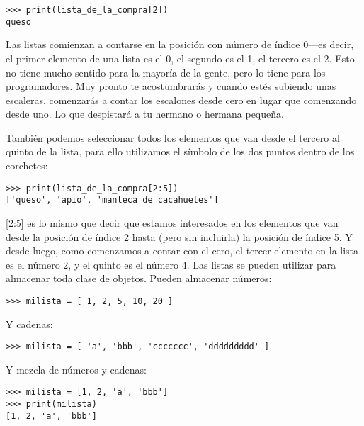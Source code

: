 \begin{listing}
\begin{verbatim}
>>> print(lista_de_la_compra[2])
queso
\end{verbatim}
\end{listing}

Las listas comienzan a contarse en la posición con número de índice 0---es decir, el primer elemento de una lista es el 0, el segundo es el 1, el tercero es el 2. Esto no tiene mucho sentido para la mayoría de la gente, pero lo tiene para los programadores. Muy pronto te acostumbrarás y cuando estés subiendo unas escaleras, comenzarás a contar los escalones desde cero en lugar que comenzando desde uno. Lo que despistará a tu hermano o hermana pequeña.
\par
También podemos seleccionar todos los elementos que van desde el tercero al quinto de la lista, para ello utilizamos el símbolo de los dos puntos dentro de los corchetes:

\begin{listing}
\begin{verbatim}
>>> print(lista_de_la_compra[2:5])
['queso', 'apio', 'manteca de cacahuetes']
\end{verbatim}
\end{listing}

[2:5] es lo mismo que decir que estamos interesados en los elementos que van desde la posición de índice 2 hasta (pero sin incluirla) la posición de índice 5. Y desde luego, como comenzamos a contar con el cero, el tercer elemento en la lista es el número 2, y el quinto es el número 4. Las listas se pueden utilizar para almacenar toda clase de objetos.  Pueden almacenar números:

\begin{listing}
\begin{verbatim}
>>> milista = [ 1, 2, 5, 10, 20 ]
\end{verbatim}
\end{listing}

\noindent
Y cadenas:

\begin{listing}
\begin{verbatim}
>>> milista = [ 'a', 'bbb', 'ccccccc', 'ddddddddd' ]
\end{verbatim}
\end{listing}

\noindent
Y mezcla de números y cadenas:

\begin{listing}
\begin{verbatim}
>>> milista = [1, 2, 'a', 'bbb']
>>> print(milista)
[1, 2, 'a', 'bbb']
\end{verbatim}
\end{listing}

